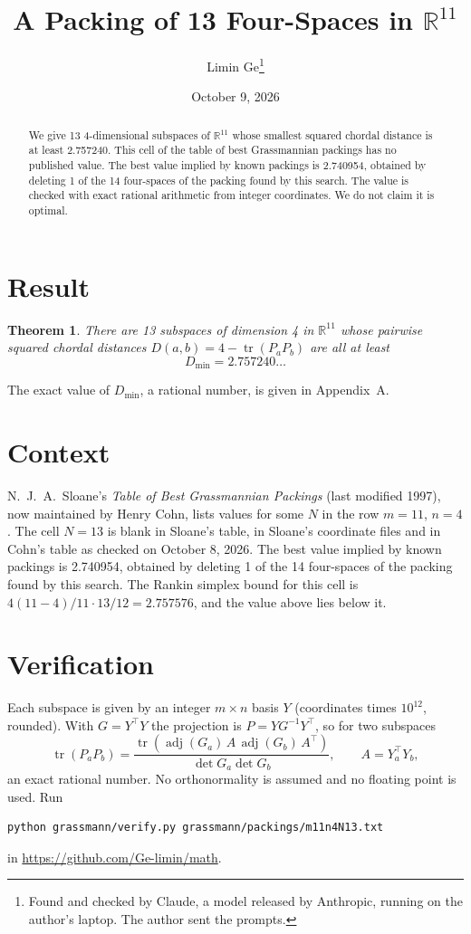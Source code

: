 \documentclass[11pt,a4paper]{article}
\title{A Packing of 13 Four-Spaces in $\mathbb{R}^{11}$}
\author{Limin Ge\thanks{Found and checked by Claude, a model released by Anthropic, running on the author's laptop. The author sent the prompts.}}
\date{October 9, 2026}
\newtheorem*{theorem}{Theorem}
\begin{document}
\maketitle
\begin{abstract}
We give 13 4-dimensional subspaces of $\mathbb{R}^{11}$ whose smallest squared chordal distance is at least 2.757240. This cell of the table of best Grassmannian packings has no published value. The best value implied by known packings is 2.740954, obtained by deleting 1 of the 14 four-spaces of the packing found by this search. The value is checked with exact rational arithmetic from integer coordinates. We do not claim it is optimal.
\end{abstract}

\section{Result}
\begin{theorem}
There are 13 subspaces of dimension 4 in $\mathbb{R}^{11}$ whose pairwise squared chordal distances $D(a,b) = 4 - \operatorname{tr}(P_aP_b)$ are all at least
\[ D_{\min} = 2.757240\ldots \]
\end{theorem}
The exact value of $D_{\min}$, a rational number, is given in Appendix~A.


\section{Context}
N.~J.~A.~Sloane's \emph{Table of Best Grassmannian Packings} (last modified 1997), now maintained by Henry Cohn, lists values for some $N$ in the row $m=11$, $n=4$. The cell $N=13$ is blank in Sloane's table, in Sloane's coordinate files and in Cohn's table as checked on October 8, 2026. The best value implied by known packings is 2.740954, obtained by deleting 1 of the 14 four-spaces of the packing found by this search. The Rankin simplex bound for this cell is $4(11-4)/11\cdot 13/12 = 2.757576$, and the value above lies below it.


\section{Verification}
Each subspace is given by an integer $m\times n$ basis $Y$ (coordinates times $10^{12}$, rounded). With $G=Y^\top Y$ the projection is $P=YG^{-1}Y^\top$, so for two subspaces
\[ \operatorname{tr}(P_aP_b)=\frac{\operatorname{tr}(\operatorname{adj}(G_a)\,A\,\operatorname{adj}(G_b)\,A^\top)}{\det G_a\det G_b},\qquad A=Y_a^\top Y_b, \]
an exact rational number. No orthonormality is assumed and no floating point is used. Run
\begin{verbatim}
python grassmann/verify.py grassmann/packings/m11n4N13.txt
\end{verbatim}
in \url{https://github.com/Ge-limin/math}.
\end{document}
